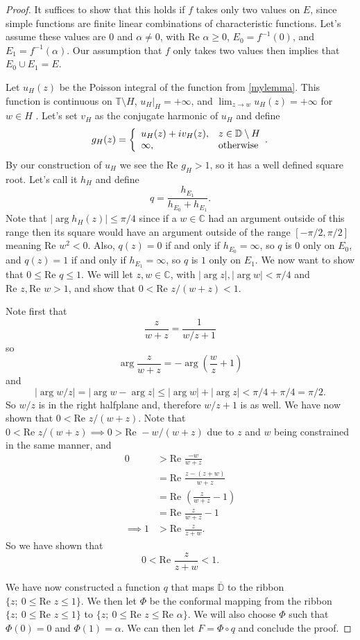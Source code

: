 \documentclass[a4paper,12pt,twoside,BCOR=10mm]{scrbook}
\theoremstyle{definition}
\theoremstyle{definition}
\theoremstyle{definition}
\renewcommand{\Re}{\text{Re }}
\begin{document}
\begin{proof}
It suffices to show that this holds if $f$ takes only two values on $E$, since simple functions are finite linear combinations of characteristic functions.
Let's assume these values are $0$ and $\alpha \neq 0$, with $\Re \alpha \geq 0$, $E_0 = f^{-1}(0)$, and $E_1 = f^{-1}(\alpha)$.
Our assumption that $f$ only takes two values then implies that $E_0 \cup E_1 = E$.

Let $u_H(z)$ be the Poisson integral of the function from \ref{mylemma}.
This function is continuous on $\mathbb{T} \setminus H$, $u_H|_H = +\infty$, and $\lim_{z \rightarrow w} u_H(z) = +\infty$ for $w \in H$ \citep[page $234$]{rudin2}.
Let's set $v_H$ as the conjugate harmonic of $u_H$ and define
\[
	g_H(z) =
	\left \{
		\begin{array}{l l}
		u_H(z) + iv_H(z), & z \in \mathbb{D} \setminus H\\
		\infty, & \text{otherwise}
		\end{array}.
	\right .
\]
By our construction of $u_H$ we see the $\Re g_H > 1$, so it has a well defined square root.
Let's call it $h_H$ and define
\[
	q = \frac{h_{E_1}}{h_{E_0} + h_{E_1}}.
\]
Note that $|\arg h_H(z)| \leq \pi/4$ since if a $w \in \mathbb{C}$ had an argument outside of this range then its square would have an argument outside of the range $[-\pi/2, \pi/2]$ meaning $\Re w^2 < 0$.
Also, $q(z) = 0$ if and only if $h_{E_0} = \infty$, so $q$ is $0$ only on $E_0$, and $q(z) = 1$ if and only if $h_{E_1} = \infty$, so $q$ is $1$ only on $E_1$.
We now want to show that $0 \leq \Re q \leq 1$.
We will let $z, w \in \mathbb{C}$, with $|\arg z|, |\arg w| < \pi/4$ and $\Re z, \Re w > 1$, and show that $0 < \Re z/(w + z) < 1$.

Note first that
\[
	\frac{z}{w + z}
	=
	\frac{1}{w/z + 1}
\]
so 
\[
	\arg \frac{z}{w + z} = -\arg \left ( \frac{w}{z} + 1 \right )
\]
and
\[
	|\arg w/z| = |\arg w - \arg z| \leq |\arg w| + |\arg z| < \pi/4 + \pi/4 = \pi/2.
\]
So $w/z$ is in the right halfplane and, therefore $w/z + 1$ is as well.
We have now shown that $0 < \Re z/(w + z)$.
Note that $0 < \Re z/(w + z) \implies 0 > \Re -w/(w + z)$ due to $z$ and $w$ being constrained in the same manner, and
\begin{align*}
	0
	&> \Re \frac{-w}{w + z}\\
	&= \Re \frac{z - (z + w)}{w + z}\\
	&= \Re \left ( \frac{z}{w + z} - 1 \right )\\
	&= \Re \frac{z}{w + z} - 1\\
	\implies 1 &> \Re \frac{z}{z + w}.
\end{align*}
So we have shown that
\[
	0 < \Re \frac{z}{z + w} < 1.
\]

We have now constructed a function $q$ that maps $\overline{\mathbb{D}}$ to the ribbon $\{z;\ 0 \leq \Re z \leq 1\}$.
We then let $\Phi$ be the conformal mapping from the ribbon $\{z;\ 0 \leq \Re z \leq 1\}$ to $\{z;\ 0 \leq \Re z \leq \Re \alpha\}$.
We will also choose $\Phi$ such that $\Phi(0) = 0$ and $\Phi(1) = \alpha$.
We can then let $F = \Phi \circ q$ and conclude the proof.

\end{proof}
\end{document}
